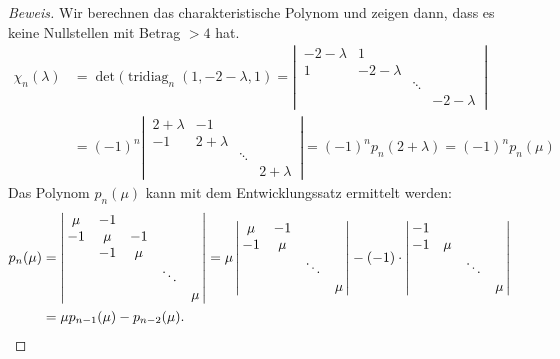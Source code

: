 \begin{proof}[Beweis]
Wir berechnen das charakteristische Polynom und zeigen dann, dass es
keine Nullstellen mit Betrag $>4$ hat.
\begin{align*}
\chi_n(\lambda)
&=
\det(\operatorname{tridiag}_n(1,-2-\lambda,1)
=
\left|
\,
\begin{matrix}
-2-\lambda&         1&      &          \\
1         &-2-\lambda&      &          \\
          &          &\ddots&          \\
          &          &      &-2-\lambda
\end{matrix}
\,
\right|
\\
&=(-1)^n
\left|
\,
\begin{matrix}
2+\lambda&        -1&      &         \\
-1        &2+\lambda&      &         \\
          &         &\ddots&         \\
          &         &      &2+\lambda
\end{matrix}
\,
\right|
=(-1)^n p_n(2+\lambda)=(-1)^np_n(\mu)
\end{align*}
Das Polynom $p_n(\mu)$ kann mit dem Entwicklungssatz ermittelt
werden:
\begin{align}
p_n(\mu)
&=
\left|
\,
\begin{matrix}
\mu& -1&   &      &   \\
-1 &\mu& -1&      &   \\
   & -1&\mu&      &   \\
   &   &   &\ddots&   \\
   &   &   &      &\mu
\end{matrix}
\,
\right|
=
\mu
\left|
\,
\begin{matrix}
\mu& -1&      &   \\
 -1&\mu&      &   \\
   &   &\ddots&   \\
   &   &      &\mu
\end{matrix}
\,
\right|
-(
-1)\cdot
\left|
\,
\begin{matrix}
 -1&   &      &   \\
 -1&\mu&      &   \\
   &   &\ddots&   \\
   &   &      &\mu
\end{matrix}
\,
\right|
\notag
\\
&=\mu p_{n-1}(\mu)- p_{n-2}(\mu).
\label{heat:rekursion}
\end{align}

\end{proof}
